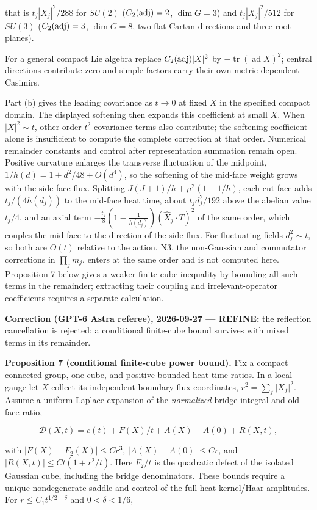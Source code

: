 \documentclass[11pt,a4paper]{article}
\begin{document}
that is \(t_j|X_j|^2/288\) for \(SU(2)\) (\(C_2({\rm adj})=2\),
\(\dim G=3\)) and \(t_j|X_j|^2/512\) for \(SU(3)\)
(\(C_2({\rm adj})=3\), \(\dim G=8\), two flat Cartan directions and
three root planes).

For a general compact Lie algebra replace \(C_2({\rm adj})|X|^2\) by
\(-\operatorname{tr}(\operatorname{ad}X)^2\); central directions
contribute zero and simple factors carry their own metric-dependent
Casimirs.

Part (b) gives the leading covariance as \(t\to0\) at fixed \(X\) in the
specified compact domain. The displayed softening then expands this
coefficient at small \(X\). When \(|X|^2\sim t\), other order-\(t^2\)
covariance terms also contribute; the softening coefficient alone is
insufficient to compute the complete correction at that order. Numerical
remainder constants and control after representation summation remain
open. Positive curvature enlarges the transverse fluctuation of the
midpoint, \(1/h(d)=1+d^2/48+O(d^4)\), so the softening of the mid-face
weight grows with the side-face flux. Splitting
\(J(J+1)/h+\mu^2(1-1/h)\), each cut face adds \(t_j/(4h(d_j))\) to the
mid-face heat time, about \(t_jd_j^2/192\) above the abelian value
\(t_j/4\), and an axial term
\(-\frac{t_j}8(1-\frac1{h(d_j)})(\hat X_j\cdot T)^2\) of the same order,
which couples the mid-face to the direction of the side flux. For
fluctuating fields \(d_j^2\sim t\), so both are \(O(t)\) relative to the
action. N3, the non-Gaussian and commutator corrections in
\(\prod_jm_j\), enters at the same order and is not computed here.
Proposition 7 below gives a weaker finite-cube inequality by bounding
all such terms in the remainder; extracting their coupling and
irrelevant-operator coefficients requires a separate calculation.

\textbf{Correction (GPT-6 Astra referee), 2026-09-27 --- REFINE:} the
reflection cancellation is rejected; a conditional finite-cube bound
survives with mixed terms in its remainder.

\textbf{Proposition 7 (conditional finite-cube power bound).} Fix a
compact connected group, one cube, and positive bounded heat-time
ratios. In a local gauge let \(X\) collect its independent boundary flux
coordinates, \(r^2=\sum_f|X_f|^2\). Assume a uniform Laplace expansion
of the \emph{normalized} bridge integral and old-face ratio,

\[\mathcal D(X,t)=c(t)+F(X)/t+A(X)-A(0)+R(X,t),\]

with \(|F(X)-F_2(X)|\le Cr^3\), \(|A(X)-A(0)|\le Cr\), and
\(|R(X,t)|\le Ct(1+r^2/t)\). Here \(F_2/t\) is the quadratic defect of
the isolated Gaussian cube, including the bridge denominators. These
bounds require a unique nondegenerate saddle and control of the full
heat-kernel/Haar amplitudes. For \(r\le C_1t^{1/2-\delta}\) and
\(0<\delta<1/6\),
\end{document}

